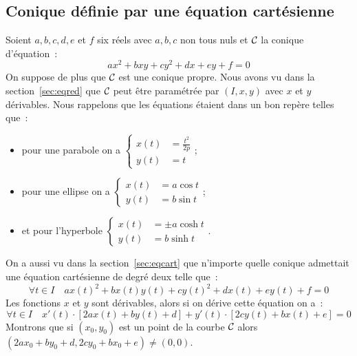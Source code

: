 \subsection{Conique définie par une équation cartésienne}
Soient \(a,b,c,d,e\) et \(f\) six réels avec \(a,b,c\) non tous nuls et 
\(\mathcal{C}_{{}}\) la conique d'équation~:
\begin{equation}
  ax^2+bxy+cy^2+dx+ey+f=0
\end{equation}
On suppose de plus que \(\mathcal{C}_{{}}\) est une conique propre. Nous avons vu dans 
la section~\ref{sec:eqred} que \(\mathcal{C}_{{}}\) peut être paramétrée par 
\((I,x,y)\) avec \(x\) et \(y\) dérivables. Nous rappelons que les équations 
étaient dans un bon repère telles que~:
\begin{itemize}
  \item pour une parabole on a \(\begin{cases} x(t) &= \frac{t^2}{2p} \\ y(t) 
    &= t \end{cases}\);
  \item pour une ellipse on a \(\begin{cases} x(t) &= a\cos t\\ y(t) &= 
      b\sin t \end{cases}\);
  \item  et pour l'hyperbole \(\begin{cases} x(t) &= \pm a\cosh t\\ y(t) 
        &= b\sinh t \end{cases}\).
\end{itemize}
On a aussi vu dans la section~\ref{sec:eqcart} que n'importe quelle 
conique admettait une équation cartésienne de degré deux telle que~:
\begin{equation}
  \forall t \in I \quad   ax(t)^2+bx(t)y(t)+cy(t)^2+dx(t)+ey(t)+f=0
\end{equation}
Les fonctions \(x\) et \(y\) sont dérivables, alors si on dérive cette 
équation on a~:
\begin{equation}
  \forall t \in I \quad x'(t) \cdot [2ax(t)+by(t)+d]+y'(t) \cdot 
  [2cy(t)+bx(t)+e]=0
\end{equation}
Montrons que si \((x_0,y_0)\) est un point de la courbe \(\mathcal{C}_{{}}\) 
alors \((2ax_0+by_0+d,2cy_0+bx_0+e)\neq (0,0)\).
